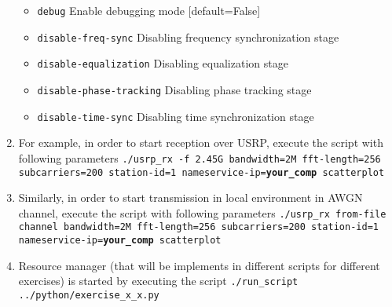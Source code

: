 \begin{enumerate}
\begin{itemize}
   		\item   \texttt{\option debug}             Enable debugging mode [default=False]
   		\item   \texttt{\option disable-freq-sync} Disabling frequency synchronization stage
    		\item  \texttt{\option disable-equalization} Disabling equalization stage
    		\item  \texttt{\option disable-phase-tracking} Disabling phase tracking stage
    		\item  \texttt{\option disable-time-sync} Disabling time synchronization stage
	\end{itemize}

	\item For example, in order to start reception over USRP, execute the script with following parameters \newline \texttt{./usrp\_rx -f 2.45G \option bandwidth=2M \option fft-length=256 \option subcarriers=200 \newline
	\option station-id=1 \option nameservice-ip=\textbf{your\_comp} \option scatterplot}
	\item Similarly, in order to start transmission in local environment in AWGN channel, execute the script with following parameters \newline 
	\texttt{./usrp\_rx \option from-file channel \option bandwidth=2M \option fft-length=256 \option subcarriers=200\newline
	\option station-id=1 \option nameservice-ip=\textbf{your\_comp} \option scatterplot}
	\item Resource manager (that will be implements in  different scripts for different exercises)  is started by executing the script\newline
	\texttt{./run\_script ../python/exercise\_x\_x.py}
\end{enumerate}


